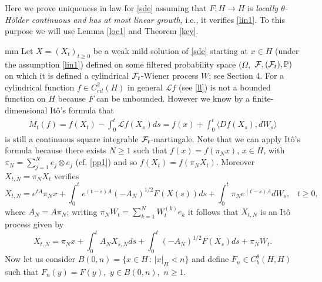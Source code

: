\documentclass[preprint]{imsart}
\def\P{\mathbb P}
\def\L{\mathcal L}
\begin{document}
%  

Here 
we  
prove uniqueness in law for \eqref{sde} assuming that  $F: H \to H$ 
 is {\sl locally $\theta$-H\"older continuous and has at most linear growth,} i.e., it verifies \eqref{lin1}. 
 To this purpose  we will use Lemma \ref{loc1} and Theorem  \ref{key}.  
   
 
 mm 
Let $X= (X_t)_{t \ge 0}$  be a weak mild solution of \eqref{sde} starting at $x \in H$ (under the assumption \eqref{lin1}) defined on some filtered probability space $(
\Omega,$ $ {\cal F},
 ({\cal F}_{t}), \P) $ on which it is defined a
 cylindrical ${\cal F}_{t}$-Wiener process $W$; see Section 4. For a cylindrical function $f \in C^2_{cil}(H) $ in general $\L f$ (see \eqref{ll}) is not a bounded function on $H$ because  $F$ can be unbounded. However
 we  know by a finite-dimensional It\^o's formula that 
 \begin{equation} \label{ffu}
  \begin{array}{l}
   M_t(f) =  f(X_t) - \int_0^t \L f(X_s)ds = f(x) + \int_0^t \langle Df(X_s), dW_s \rangle 
 \end{array} 
 \end{equation}
 is still   a continuous square integrable ${\cal F}_t$-martingale. Note that we can apply It\^o's formula  because there exists $N \ge 1$ such that  $f(x) = f(\pi_N x)$, $x \in H$, with $\pi_N=\sum_{j=1}^Ne_j\otimes e_j$ (cf. \eqref{pp1}) and so  $f(X_t) = f(\pi_N X_t)$.  Moreover  $X_{t, N}
  = \pi_N X_t$ verifies  
 \begin{equation*} 
 X_{t, N}=e^{tA} \pi_N  x +\int_{0}^{t}e^{\left(  t-s\right)  A} (-A_N)^{1/2}F^{}(X(s))
ds+\int_{0}^{t} \pi_N e^{\left(  t-s\right)  A}dW_{s},\;\;\; t \ge 0,
\end{equation*}
where  $A_N=A\pi_N $; writing $\pi_N W_t = \sum_{k=1}^N W_t^{(k)} e_k$ it follows that $X_{t, N}$ is an It\^o process given by 
\begin{equation} \label{maga} 
X_{t, N}
= \pi_Nx+\int_0^tA_N X_{s,N}ds+\int_0^t  (-A_N)^{1/2}F(X_{s})ds+\pi_N W_t.
 \end{equation} 
   Now let us consider  $B(0,n) = \{x \in H \, :\, |x|_H <n \}$ and define   $F_n \in C_b^{\theta} (H,H)$ such that 
$
F_n (y) = F(y),$ $ y \in B(0,n), 
$ $n \ge 1.  $   
\end{document}
